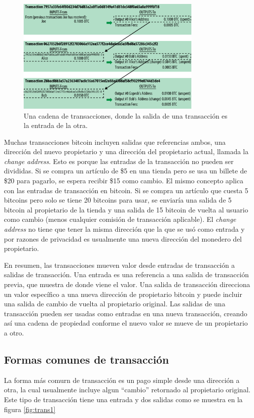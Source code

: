 \documentclass[10pt,journal,compsoc]{IEEEtran}
\begin{document}
\begin{figure}[h]
    \center
    \includegraphics[width=9cm]{chain}
    \caption{Una cadena de transacciones, donde la salida de una transacción es la entrada de la otra.}
    \label{fig:chain}
\end{figure}

Muchas transacciones bitcoin incluyen salidas que referencias ambos, una dirección del nuevo propietario y una dirección del propietario actual, llamada la \emph{change address}. Esto es porque las entradas de la transacción no pueden ser divididas. Si se compra un artículo de \$5 en una tienda pero se usa un billete de \$20 para pagarlo, se espera recibir \$15 como cambio. El mismo concepto aplica con las entradas de transacción en bitcoin. Si se compra un artículo que cuesta 5 bitcoins pero solo se tiene 20 bitcoins para usar, se enviaría una salida de 5 bitcoin al propietario de la tienda y una salida de 15 bitcoin de vuelta al usuario como cambio (menos cualquier comisión de transacción aplicable). El \emph{change address} no tiene que tener la misma dirección que la que se usó como entrada y por razones de privacidad es usualmente una nueva dirección del monedero del propietario.

En resumen, las transacciones mueven valor desde entradas de transacción a salidas de transacción. Una entrada es una referencia a una salida de transacción previa, que muestra de donde viene el valor. Una salida de transacción direcciona un valor específico a una nueva dirección de propietario bitcoin y puede incluir una salida de cambio de vuelta al propietario original. Las salidas de una transacción pueden ser usadas como entradas en una nueva transacción, creando así una cadena de propiedad conforme el nuevo valor se mueve de un propietario a otro. 

\subsection{Formas comunes de transacción}
La forma más comurn de transacción es un pago simple desde una dirección a otra, la cual usualmente incluye algun ``cambio'' retornado al propietario original. Este tipo de transacción tiene una entrada y dos salidas como se muestra en la figura \ref{fig:trans1}    
\end{document}
